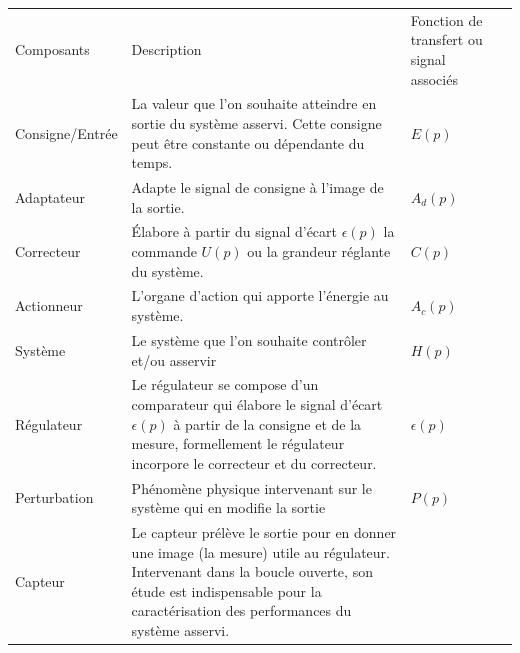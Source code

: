 \begin{table}[!h]
\begin{center}
    \begin{tabular}{M{3cm}M{8cm}M{4cm}N}
        \hhline{===}
        Composants      & Description & Fonction de transfert ou signal associés &\\[2em]
        \hhline{===}
        Consigne/Entrée & La valeur que l'on souhaite atteindre en sortie du système asservi.
                          Cette consigne peut être constante ou dépendante du temps. 
                        & $E(p)$                                                 &\\[5em]
        \hline
        Adaptateur      & Adapte le signal de consigne à l'image de la sortie.           
                        & $A_d(p)$                                               &\\[3em]
        \hline
        Correcteur      & \'Elabore à partir du signal d'écart $\epsilon(p)$ 
                          la commande $U(p)$ ou la grandeur réglante du système.
                        & $C(p)$                                                 & \\[3em]
        \hline
        Actionneur      & L'organe d'action qui apporte l'énergie au système.
                        & $A_c(p)$                                               &\\[3em]
        \hline
        Système         & Le système que l'on souhaite contrôler et/ou asservir
                                      & $H(p)$                                   &\\[3em]
        \hline
        Régulateur      & Le régulateur se compose d'un comparateur qui élabore le signal d'écart $\epsilon(p)$ 
                          à partir de la consigne et de la mesure, formellement le régulateur incorpore le correcteur 
                          et du correcteur.
                                      & $\epsilon(p)$                            &\\[3em]
        \hline
        Perturbation    & Phénomène physique intervenant sur le système qui en modifie la sortie
                                      & $P(p)$                                   &\\[3em]
        \hline
        Capteur         &  Le capteur prélève le sortie pour en donner une image (la mesure) 
                           utile au régulateur. Intervenant dans la boucle ouverte, son étude 
                           est indispensable pour la caractérisation des performances du système asservi.

\end{tabular}
\end{center}
\end{table}
